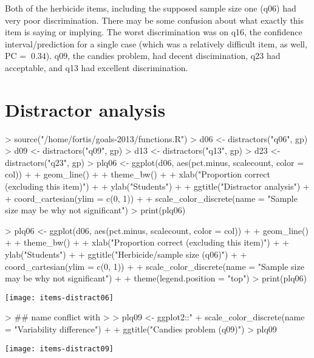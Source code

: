 \documentclass[11pt]{article}
\begin{document}
Both of the herbicide items, including the supposed sample size one (q06) had very poor discrimination.  There may be some confusion about what exactly this item is saying or implying. The worst discrimination was on q16, the confidence interval/prediction for a single case (which was a relatively difficult item, as well, PC = $~ 0.34$).  q09, the candies problem, had decent discimination, q23 had acceptable, and q13 had excellent discrimination.
\section{Distractor analysis}
\label{sec-2}

\begin{Schunk}
\begin{Sinput}
> source("/home/fortis/goals-2013/functions.R")
> d06 <- distractors("q06", gp)
> d09 <- distractors("q09", gp)
> d13 <- distractors("q13", gp)
> d23 <- distractors("q23", gp)
> plq06 <- ggplot(d06, aes(pct.minus, scalecount, color = col)) +
+     geom_line() +
+     theme_bw() +
+     xlab("Proportion correct (excluding this item)") +
+     ylab("Students") +
+     ggtitle("Distractor analysis") +
+     coord_cartesian(ylim = c(0, 1)) + 
+     scale_color_discrete(name = "Sample size may be why not significant")
> print(plq06)
\end{Sinput}
\end{Schunk}

\begin{Schunk}
\begin{Sinput}
> plq06 <- ggplot(d06, aes(pct.minus, scalecount, color = col)) +
+     geom_line() +
+     theme_bw() +
+     xlab("Proportion correct (excluding this item)") +
+     ylab("Students") +
+     ggtitle("Herbicide/sample size (q06)") +
+     coord_cartesian(ylim = c(0, 1)) + 
+     scale_color_discrete(name = "Sample size may be why not significant") +
+     theme(legend.position = "top")
> print(plq06)
\end{Sinput}
\end{Schunk}
\texttt{[image: items-distract06]}

\begin{Schunk}
\begin{Sinput}
> ## name conflict with %+%, which is why I need to use colon notation here
> 
> plq09 <- ggplot2::"%+%"(plq06, d09) + 
+     scale_color_discrete(name = "Variability difference") +
+     ggtitle("Candies problem (q09)")
> plq09
\end{Sinput}
\end{Schunk}
\texttt{[image: items-distract09]}
\end{document}
